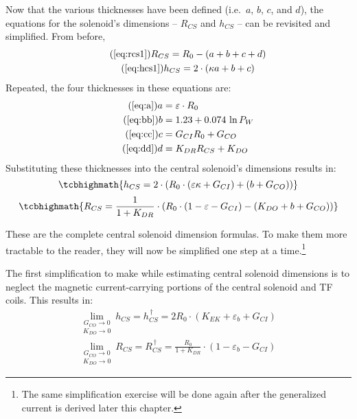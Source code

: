 Now that the various thicknesses have been defined (i.e.\ $a$, $b$, $c$, and $d$), the equations for the solenoid's dimensions -- $R_{CS}$ and $h_{CS}$ -- can be revisited and simplified. From before,
 \begin{gather}
 	\tag{\ref{eq:rcs1}}
 	R_{CS} = R_0 - ( a + b + c + d ) \\
	\tag{\ref{eq:hcs1}}
 	h_{CS} = 2 \cdot \left ( \kappa a + b + c \right)
 \end{gather}
Repeated, the four thicknesses in these equations are:
\begin{align}
	\tag{\ref{eq:a}}
	a &= \varepsilon \cdot R_0 \\
	\tag{\ref{eq:bb}}
	b &= 1.23 + 0.074 \ \textnormal{ln} \, P_W \\
	\tag{\ref{eq:cc}}
	c &= G_{CI} R_0 + G_{CO} \\
 	\tag{\ref{eq:dd}}
	d &= K_{DR} R_{CS} + K_{DO}
\end{align}
Substituting these thicknesses into the central solenoid's dimensions results in:
\begin{equation}
	\tcbhighmath{
	h_{CS} = 2 \cdot \left( R_0 \cdot \left( \varepsilon \kappa + G_{CI} \right) + \left( b + G_{CO} \right) \right)
	}
\end{equation}
\begin{equation}
	\tcbhighmath{
	R_{CS} = \frac{ 1 }{ 1 + K_{DR} } \cdot \left( R_0 \cdot \left( 1 - \varepsilon - G_{CI}  \right) - \left( K_{DO} + b + G_{CO}  \right) \right)
	}
\end{equation}

These are the complete central solenoid dimension formulas. To make them more tractable to the reader, they will now be simplified one step at a time.\footnote{The same simplification exercise will be done again after the generalized current is derived later this chapter.}

The first simplification to make while estimating central solenoid dimensions is to neglect the magnetic current-carrying portions of the central solenoid and TF coils. This results in:
\begin{gather}
	\underset{K_{DO} \to 0}{\underset{G_{CO} \to 0}{\lim}} \ h_{CS} = h_{CS}^{\,\dagger} = 2 R_0 \cdot \left( K_{EK} + \varepsilon_b + G_{CI} \right) \\
	\underset{K_{DO} \to 0}{\underset{G_{CO} \to 0}{\lim}} \ R_{CS} = R_{CS}^{\,\dagger} = \frac{ R_0 }{ 1 + K_{DR} } \cdot \left( 1 - \varepsilon_b - G_{CI}  \right)
\end{gather}

